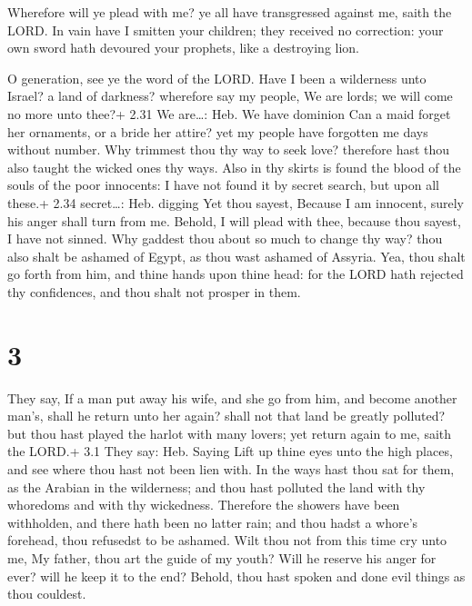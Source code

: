  Wherefore will ye plead with me? ye all have transgressed
against me, saith the LORD.  In vain have I smitten your
children; they received no correction: your own sword hath devoured your
prophets, like a destroying lion.

 O generation, see ye the word of the LORD. Have I been a
wilderness unto Israel? a land of darkness? wherefore say my people, We
are lords; we will come no more unto thee?+ 2.31 We are\ldots: Heb. We
have dominion  Can a maid forget her ornaments, or a bride
her attire? yet my people have forgotten me days without number.
 Why trimmest thou thy way to seek love? therefore hast
thou also taught the wicked ones thy ways.  Also in thy
skirts is found the blood of the souls of the poor innocents: I have not
found it by secret search, but upon all these.+ 2.34 secret\ldots: Heb.
digging  Yet thou sayest, Because I am innocent, surely his
anger shall turn from me. Behold, I will plead with thee, because thou
sayest, I have not sinned.  Why gaddest thou about so much
to change thy way? thou also shalt be ashamed of Egypt, as thou wast
ashamed of Assyria.  Yea, thou shalt go forth from him, and
thine hands upon thine head: for the LORD hath rejected thy confidences,
and thou shalt not prosper in them.

\hypertarget{section-2}{%
\section{3}\label{section-2}}

 They say, If a man put away his wife, and she go from him,
and become another man's, shall he return unto her again? shall not that
land be greatly polluted? but thou hast played the harlot with many
lovers; yet return again to me, saith the LORD.+ 3.1 They say: Heb.
Saying  Lift up thine eyes unto the high places, and see
where thou hast not been lien with. In the ways hast thou sat for them,
as the Arabian in the wilderness; and thou hast polluted the land with
thy whoredoms and with thy wickedness.  Therefore the
showers have been withholden, and there hath been no latter rain; and
thou hadst a whore's forehead, thou refusedst to be ashamed.
 Wilt thou not from this time cry unto me, My father, thou
art the guide of my youth?  Will he reserve his anger for
ever? will he keep it to the end? Behold, thou hast spoken and done evil
things as thou couldest.

